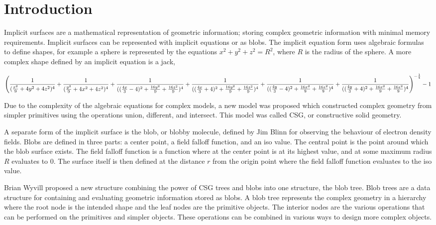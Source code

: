 \documentclass[conference]{acmsiggraph}
\begin{document}
\keywordlist

\copyrightspace

\section{Introduction}

Implicit surfaces are a mathematical representation of geometric information;
storing complex geometric information with minimal memory requirements.
Implicit surfaces can be represented with implicit equations or as blobs. The
implicit equation form uses algebraic formulas to define shapes, for example a
sphere is represented by the equations $x^2 + y^2 + z^2 = R^2$, where $R$ is
the radius of the sphere. A more complex shape defined by an implicit equation
is a jack,

\begin{dmath*}
\left({1 \over ({x^2 \over 9} +  4y^2 + 4z^2)^4} +
{1 \over ({y^2 \over 9} +  4x^2 + 4z^2)^4} +
{1 \over (({4x \over 3} - 4)^2 + {16y^2 \over 9} +  {16z^2 \over 9})^4} +
{1 \over (({4x \over 3} + 4)^2 + {16y^2 \over 9} +  {16z^2 \over 9})^4} +
{1 \over (({4y \over 3} - 4)^2 + {16x^2 \over 9} +  {16z^2 \over 9})^4} +
{1 \over (({4y \over 3} + 4)^2 + {16x^2 \over 9} +  {16z^2 \over 9})^4}\right)^ {-
	{1\over 4}} - 1
\end{dmath*}
\cite{Bloomenthal1994}

Due to the complexity of the algebraic equations for complex models, a new model
was proposed which constructed complex geometry from simpler primitives using
the operations union, different, and intersect. This model was called CSG, or
constructive solid geometry.

A separate form of the implicit surface is the blob, or blobby molecule,
defined by Jim Blinn\cite{Blinn} for observing the behaviour of electron
density fields. Blobs are defined in three parts: a center point, a
field falloff function, and an iso value. The central point is the point around
which the blob surface exists. 
The field falloff function is a function where at
the center point is at its highest value, and at some maximum radius $R$
evaluates to 0. The surface itself is then defined at the distance $r$ from the
origin point where the field falloff function evaluates to the iso value.

Brian Wyvill proposed a new structure combining the power of CSG trees and
blobs into one structure, the blob tree. Blob trees are a data structure for
containing and evaluating geometric information stored as blobs. A blob tree
represents the complex geometry in a hierarchy where the root node is the
intended shape and the leaf nodes are the primitive objects. The interior nodes
are the various operations that can be performed on the primitives and simpler
objects. These operations can be combined in various ways to design more
complex objects.
\end{document}
